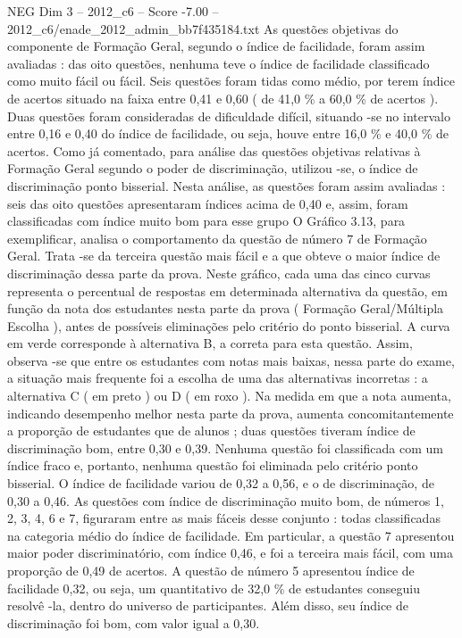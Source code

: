 \begin{textsample}{NEG Dim 3 – 2012\_c6 – Score -7.00 – 2012\_c6/enade\_2012\_admin\_bb7f435184.txt}
As questões objetivas do componente de Formação Geral, segundo o índice de facilidade, foram assim avaliadas : das oito questões, nenhuma teve o índice de facilidade classificado como muito fácil ou fácil.
Seis questões foram tidas como médio, por terem índice de acertos situado na faixa entre 0,41 e 0,60 ( de 41,0 \% a 60,0 \% de acertos ).
Duas questões foram consideradas de dificuldade difícil, situando -se no intervalo entre 0,16 e 0,40 do índice de facilidade, ou seja, houve entre 16,0 \% e 40,0 \% de acertos.
Como já comentado, para análise das questões objetivas relativas à Formação Geral segundo o poder de discriminação, utilizou -se, o índice de discriminação ponto bisserial.
Nesta análise, as questões foram assim avaliadas : seis das oito questões apresentaram índices acima de 0,40 e, assim, foram classificadas com índice muito bom para esse grupo O Gráfico 3.13, para exemplificar, analisa o comportamento da questão de número 7 de Formação Geral.
Trata -se da terceira questão mais fácil e a que obteve o maior índice de discriminação dessa parte da prova.
Neste gráfico, cada uma das cinco curvas representa o percentual de respostas em determinada alternativa da questão, em função da nota dos estudantes nesta parte da prova ( Formação Geral/Múltipla Escolha ), antes de possíveis eliminações pelo critério do ponto bisserial.
A curva em verde corresponde à alternativa B, a correta para esta questão.
Assim, observa -se que entre os estudantes com notas mais baixas, nessa parte do exame, a situação mais frequente foi a escolha de uma das alternativas incorretas : a alternativa C ( em preto ) ou D ( em roxo ).
Na medida em que a nota aumenta, indicando desempenho melhor nesta parte da prova, aumenta concomitantemente a proporção de estudantes que de alunos ; duas questões tiveram índice de discriminação bom, entre 0,30 e 0,39.
Nenhuma questão foi classificada com um índice fraco e, portanto, nenhuma questão foi eliminada pelo critério ponto bisserial.
O índice de facilidade variou de 0,32 a 0,56, e o de discriminação, de 0,30 a 0,46.
As questões com índice de discriminação muito bom, de números 1, 2, 3, 4, 6 e 7, figuraram entre as mais fáceis desse conjunto : todas classificadas na categoria médio do índice de facilidade.
Em particular, a questão 7 apresentou maior poder discriminatório, com índice 0,46, e foi a terceira mais fácil, com uma proporção de 0,49 de acertos.
A questão de número 5 apresentou índice de facilidade 0,32, ou seja, um quantitativo de 32,0 \% de estudantes conseguiu resolvê -la, dentro do universo de participantes.
Além disso, seu índice de discriminação foi bom, com valor igual a 0,30.

\end{textsample}
